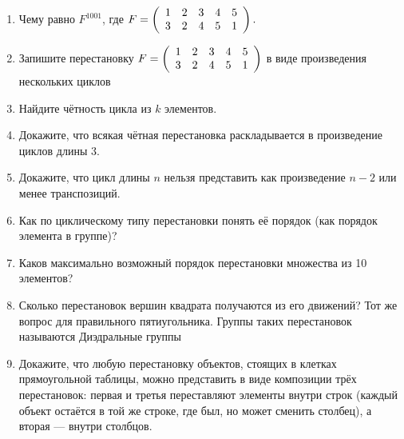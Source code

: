 \documentclass{article}
\begin{document}
\begin{enumerate}[label*=\protect\fbox{\arabic{enumi}}]
\item Чему равно $F^{1001}$, где $F = 
\left(
\begin{array}{c c c c c}
	1 & 2 & 3 & 4 & 5 \\
	3 & 2 & 4 & 5 & 1 
\end{array}
\right).$

\item Запишите перестановку $F = 
\left(
\begin{array}{c c c c c}
	1 & 2 & 3 & 4 & 5 \\
	3 & 2 & 4 & 5 & 1 
\end{array}
\right)$ в виде произведения нескольких циклов 

\item Найдите чётность цикла из $k$ элементов.

\item Докажите, что всякая чётная перестановка раскладывается в произведение циклов длины 3.

\item Докажите, что цикл длины $n$ нельзя представить как произведение $n - 2$ или менее транспозиций.

\item Как по циклическому типу перестановки понять её порядок (как порядок элемента в группе)?

\item Каков максимально возможный порядок перестановки множества из 10 элементов?

\item Сколько перестановок вершин квадрата получаются из его движений? Тот же вопрос для правильного пятиугольника. Группы таких перестановок называются Диэдральные группы

\item Докажите, что любую перестановку объектов, стоящих в клетках прямоугольной таблицы, можно представить в виде композиции трёх перестановок: первая и третья переставляют элементы внутри строк (каждый объект остаётся в той же строке, где был, но может сменить столбец), а вторая — внутри столбцов.


\end{enumerate}
\end{document}
